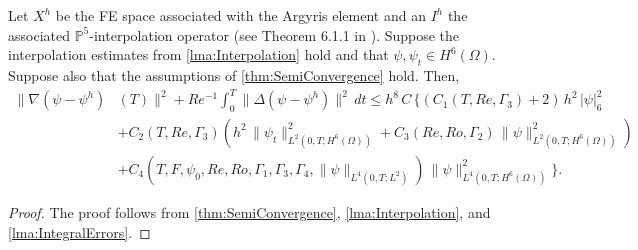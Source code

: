 \begin{thm} \label{thm:SemiInterp}
  Let $X^h$ be the FE space associated with the Argyris element and
  an $I^h$ the associated $\mathbb{P}^5$-interpolation operator (see Theorem
  6.1.1 in \cite{Ciarlet}).  Suppose the interpolation estimates from
  \autoref{lma:Interpolation} hold and that $\psi, \psi_t \in H^6(\Omega)$.
  Suppose also that the assumptions of \autoref{thm:SemiConvergence} hold.
  Then,
  \begin{equation}
    \begin{split}
      \|\nabla \left( \psi - \psi^h\right)&(T) \|^2
        + Re^{-1} \int_0^T\! \|\Delta \left(\psi - \psi^h\right)\|^2\, dt
        \le h^8\, C\, \biggl\{
        \left(C_1(T,Re,\Gamma_3) + 2\right)\, h^2\, |\psi|_6^2 \\
      & + C_2(T,Re,\Gamma_3) \left( h^2\,\|\psi_t\|_{L^2(0,T;H^6(\Omega))}^2
        + C_3(Re,Ro,\Gamma_2)\,\|\psi\|_{L^2(0,T;H^6(\Omega))}^2\right) \\
      & +
      C_4(T,F,\psi_0,Re,Ro,\Gamma_1,\Gamma_3,\Gamma_4,\|\psi\|_{L^4(0,T;L^2)})\,
        \|\psi\|_{L^4(0,T;H^6(\Omega))}^2 \biggr\}.
    \end{split}
    \label{eqn:SemiInterp}
  \end{equation}
\end{thm}
\begin{proof}
  The proof follows from \autoref{thm:SemiConvergence},
  \autoref{lma:Interpolation}, and \autoref{lma:IntegralErrors}.
\end{proof}
